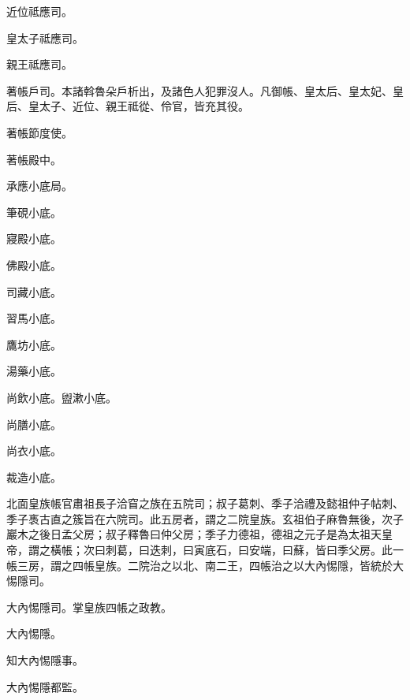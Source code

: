 \begin{pinyinscope}
 近位祗應司。



 皇太子祗應司。



 親王祗應司。



 著帳戶司。本諸斡魯朵戶析出，及諸色人犯罪沒人。凡御帳、皇太后、皇太妃、皇后、皇太子、近位、親王祗從、伶官，皆充其役。



 著帳節度使。



 著帳殿中。



 承應小底局。



 筆硯小底。



 寢殿小底。



 佛殿小底。



 司藏小底。



 習馬小底。



 鷹坊小底。



 湯藥小底。



 尚飲小底。盥漱小底。



 尚膳小底。



 尚衣小底。



 裁造小底。



 北面皇族帳官肅祖長子洽窅之族在五院司；叔子葛刺、季子洽禮及懿祖仲子帖刺、季子褭古直之簇旨在六院司。此五房者，謂之二院皇族。玄祖伯子麻魯無後，次子巖木之後日孟父房；叔子釋魯曰仲父房；季子力德祖，德祖之元子是為太祖天皇帝，謂之橫帳；次曰刺葛，曰迭刺，曰寅底石，曰安端，曰蘇，皆曰季父房。此一帳三房，謂之四帳皇族。二院治之以北、南二王，四帳治之以大內惕隱，皆統於大惕隱司。



 大內惕隱司。掌皇族四帳之政教。



 大內惕隱。



 知大內惕隱事。



 大內惕隱都監。




\end{pinyinscope}
